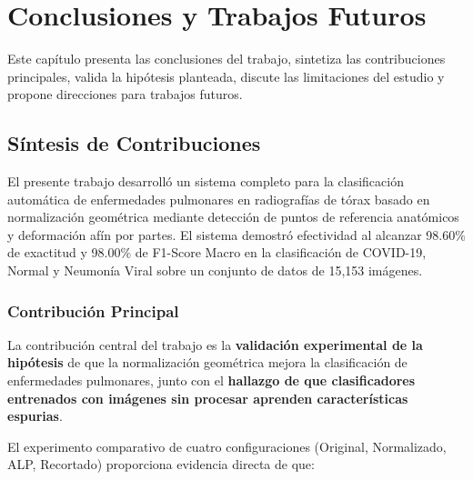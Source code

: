 
\chapter{Conclusiones y Trabajos Futuros}
\label{cap:conclusiones}

Este capítulo presenta las conclusiones del trabajo, sintetiza las contribuciones principales, valida la hipótesis planteada, discute las limitaciones del estudio y propone direcciones para trabajos futuros.

\section{Síntesis de Contribuciones}
\label{sec:sintesis_contribuciones}

El presente trabajo desarrolló un sistema completo para la clasificación automática de enfermedades pulmonares en radiografías de tórax basado en normalización geométrica mediante detección de puntos de referencia anatómicos y deformación afín por partes. El sistema demostró efectividad al alcanzar 98.60\% de exactitud y 98.00\% de F1-Score Macro en la clasificación de COVID-19, Normal y Neumonía Viral sobre un conjunto de datos de 15,153 imágenes.

\subsection{Contribución Principal}
\label{subsec:contribucion_principal}

La contribución central del trabajo es la \textbf{validación experimental de la hipótesis} de que la normalización geométrica mejora la clasificación de enfermedades pulmonares, junto con el \textbf{hallazgo de que clasificadores entrenados con imágenes sin procesar aprenden características espurias}.

El experimento comparativo de cuatro configuraciones (Original, Normalizado, ALP, Recortado) proporciona evidencia directa de que:

